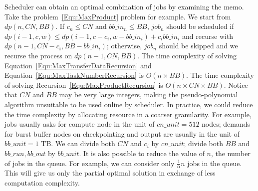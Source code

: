 Scheduler can obtain an optimal combination of jobs by examining the memo.
Take the problem~\ref{Equ:MaxProduct} problem for example.
We start from $dp(n, CN, BB)$.
If $c_n \leq CN$ and $bb\_in_n \leq BB$, $job_n$ should be scheduled if
$dp(i-1, c, w) \leq dp(i-1, c - c_i, w - bb\_in_i) + c_i bb\_in_i$ and
recurse with $dp(n - 1, CN - c_i, BB - bb\_in_i)$;
otherwise, $job_n$ should be skipped and we recurse the process on $dp(n-1, CN, BB)$.
The time complexity of solving Equation~\ref{Equ:MaxTransferDataRecursion} and
Equation~\ref{Equ:MaxTaskNumberRecursion} is $O(n\times BB)$.
The time complexity of solving Recursion~\ref{Equ:MaxProductRecursion}
is $O(n\times CN\times BB)$.
Notice that $CN$ and $BB$ may be very large integers,
making the pseudo-polynomial algorithm unsuitable
to be used online by scheduler.
In practice, we could reduce the time complexity by allocating resource
in a coarser granularity.
For example, jobs usually asks for compute node in the unit of $cn\_unit = 512$ nodes;
demands for burst buffer nodes on checkpointing and output are
usually in the unit of $bb\_unit = 1$ TB.
We can divide both $CN$ and $c_i$ by $cn\_unit$;
divide both $BB$ and $bb\_run, bb\_out$ by $bb\_unit$.
It is also possible to reduce the value of $n$, the number of jobs in the queue.
For example, we can consider only $\frac{1}{\alpha}n$ jobs in the queue.
This will give us only the partial optimal solution
in exchange of less computation complexity.

